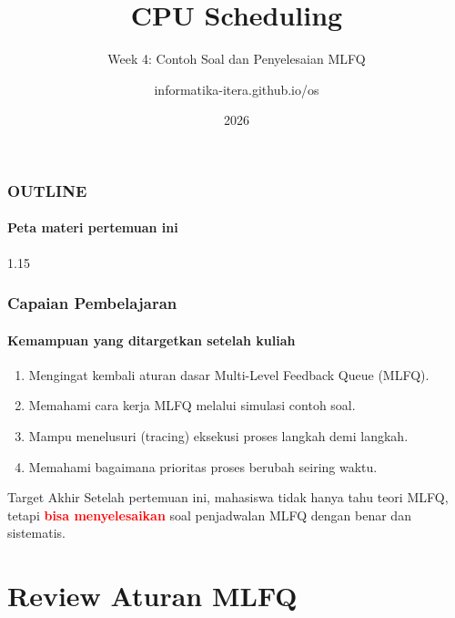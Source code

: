 \documentclass[t,aspectratio=169,xcolor=dvipsnames]{beamer}
\title[CPU Scheduling]{CPU Scheduling}
\subtitle{Week 4: Contoh Soal dan Penyelesaian MLFQ}
\author[informatika-itera.github.io/os]{informatika-itera.github.io/os}
\institute[ITERA]{Program Studi Teknik Informatika \\ Institut Teknologi Sumatera}
\date{\textcolor{nyublue}{2026}}
\newcommand{\tem}[1]{\textbf{\textcolor{red}{#1}}}
\begin{document}
\begin{frame}
    \titlepage
\end{frame}

\begin{frame}
    \frametitle{OUTLINE}
    \framesubtitle{Peta materi pertemuan ini}
    \small
    \begin{spacing}{1.15}
        \tableofcontents
    \end{spacing}
\end{frame}

\begin{frame}
    \frametitle{Capaian Pembelajaran}
    \framesubtitle{Kemampuan yang ditargetkan setelah kuliah}
    \small
    \begin{enumerate}
        \item Mengingat kembali aturan dasar Multi-Level Feedback Queue (MLFQ).
        \item Memahami cara kerja MLFQ melalui simulasi contoh soal.
        \item Mampu menelusuri (tracing) eksekusi proses langkah demi langkah.
        \item Memahami bagaimana prioritas proses berubah seiring waktu.
    \end{enumerate}
    \begin{exampleblock}{Target Akhir}
        Setelah pertemuan ini, mahasiswa tidak hanya tahu teori MLFQ, tetapi \tem{bisa menyelesaikan} soal penjadwalan MLFQ dengan benar dan sistematis.
    \end{exampleblock}
\end{frame}

\section{Review Aturan MLFQ}
\end{document}
